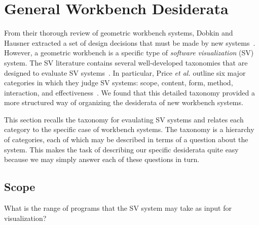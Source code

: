 \section{General Workbench Desiderata}

From their thorough review of geometric workbench systems, Dobkin and Hausner
extracted a set of design decisions that must be made by new
systems~\cite{hausner1999animation}.
However, a geometric workbench is a specific type of \emph{software
visualization} (SV) system. The SV literature contains several well-developed
taxonomies that are designed to evaluate SV systems~\cite{diehl2007software}. In
particular, Price \emph{et al.} outline six major categories in which they judge
SV systems: scope, content, form, method, interaction, and
effectiveness~\cite{price1993principled}. We found that this detailed taxonomy
provided a more structured way of organizing the desiderata of new workbench
systems.

This section recalls the taxonomy for evaulating SV systems and relates each
category to the specific case of workbench systems. The taxonomy is a hierarchy
of categories, each of which may be described in terms of a question about the
system. This makes the task of describing our specific desiderata quite easy
because we may simply answer each of these questions in turn. 


\subsection{Scope}

What is the range of programs that the SV system may take as input for
visualization?

